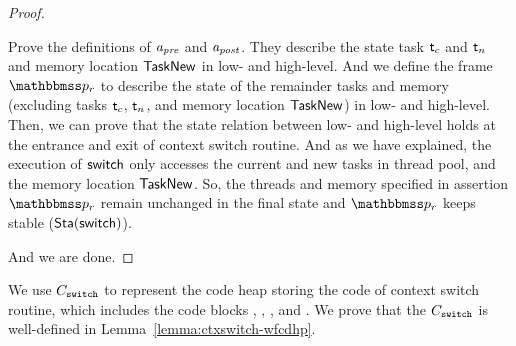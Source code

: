 {\begin{proof}
\begin{itemize}
        Prove the definitions of $\textit{a}_\textit{pre}$ and $\textit{a}_\textit{post}$. 
        They describe the state task $\textsf{t}_c$ and $\textsf{t}_n$
        and memory location $\mathsf{TaskNew}$
        in low- and high-level. And we define the frame 
        $\relastP_r$ to describe the state of the 
        remainder tasks and memory 
        (excluding tasks $\textsf{t}_c$, $\textsf{t}_n$, and 
        memory location $\mathsf{TaskNew}$) in low- and high-level.
        Then, we can prove that the 
        state relation between low- and high-level 
        holds at the entrance and 
        exit of context switch routine. 
        And as we have explained, the execution of 
        $\mathsf{switch}$ only accesses 
        the current and new tasks in thread pool, and the 
        memory location $\mathsf{TaskNew}$. So, 
        the threads and memory specified in assertion 
        $\relastP_r$ remain unchanged 
        in the final state and $\relastP_r$ keeps 
        stable ($\textsf{Sta}(\mathsf{switch})$).
    \end{itemize}
    And we are done. 
\end{proof}

We use $C_{\texttt{switch}}$ to represent the 
code heap storing the code of context switch routine, 
which includes the code blocks \SwitchEntry{}, 
\regsave{}, \regrestore{}, 
\SaveUsedWin{} and \SwitchNewTask{}. We prove that 
the $C_{\texttt{switch}}$ is well-defined in 
Lemma~\ref{lemma:ctxswitch-wfcdhp}.

}

